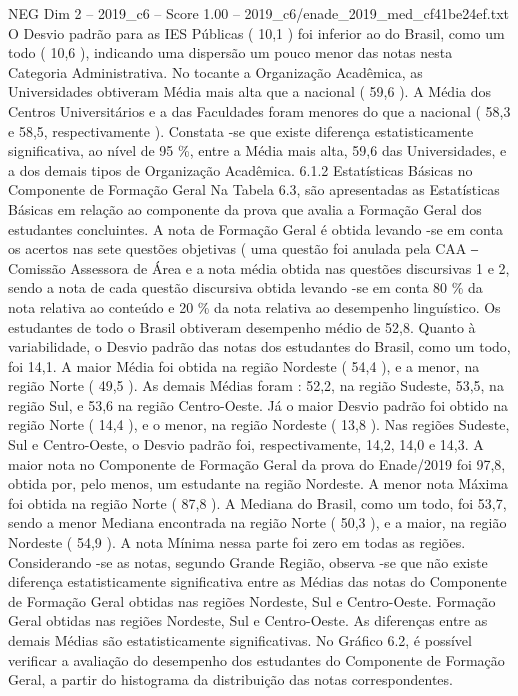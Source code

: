 \begin{textsample}{NEG Dim 2 – 2019\_c6 – Score 1.00 – 2019\_c6/enade\_2019\_med\_cf41be24ef.txt}
O Desvio padrão para as IES Públicas ( 10,1 ) foi inferior ao do Brasil, como um todo ( 10,6 ), indicando uma dispersão um pouco menor das notas nesta Categoria Administrativa.
No tocante a Organização Acadêmica, as Universidades obtiveram Média mais alta que a nacional ( 59,6 ).
A Média dos Centros Universitários e a das Faculdades foram menores do que a nacional ( 58,3 e 58,5, respectivamente ).
Constata -se que existe diferença estatisticamente significativa, ao nível de 95 \%, entre a Média mais alta, 59,6 das Universidades, e a dos demais tipos de Organização Acadêmica. 6.1.2 Estatísticas Básicas no Componente de Formação Geral Na Tabela 6.3, são apresentadas as Estatísticas Básicas em relação ao componente da prova que avalia a Formação Geral dos estudantes concluintes.
A nota de Formação Geral é obtida levando -se em conta os acertos nas sete questões objetivas ( uma questão foi anulada pela CAA ‒ Comissão Assessora de Área e a nota média obtida nas questões discursivas 1 e 2, sendo a nota de cada questão discursiva obtida levando -se em conta 80 \% da nota relativa ao conteúdo e 20 \% da nota relativa ao desempenho linguístico.
Os estudantes de todo o Brasil obtiveram desempenho médio de 52,8.
Quanto à variabilidade, o Desvio padrão das notas dos estudantes do Brasil, como um todo, foi 14,1.
A maior Média foi obtida na região Nordeste ( 54,4 ), e a menor, na região Norte ( 49,5 ).
As demais Médias foram : 52,2, na região Sudeste, 53,5, na região Sul, e 53,6 na região Centro-Oeste.
Já o maior Desvio padrão foi obtido na região Norte ( 14,4 ), e o menor, na região Nordeste ( 13,8 ).
Nas regiões Sudeste, Sul e Centro-Oeste, o Desvio padrão foi, respectivamente, 14,2, 14,0 e 14,3.
A maior nota no Componente de Formação Geral da prova do Enade/2019 foi 97,8, obtida por, pelo menos, um estudante na região Nordeste.
A menor nota Máxima foi obtida na região Norte ( 87,8 ).
A Mediana do Brasil, como um todo, foi 53,7, sendo a menor Mediana encontrada na região Norte ( 50,3 ), e a maior, na região Nordeste ( 54,9 ).
A nota Mínima nessa parte foi zero em todas as regiões.
Considerando -se as notas, segundo Grande Região, observa -se que não existe diferença estatisticamente significativa entre as Médias das notas do Componente de Formação Geral obtidas nas regiões Nordeste, Sul e Centro-Oeste.
Formação Geral obtidas nas regiões Nordeste, Sul e Centro-Oeste.
As diferenças entre as demais Médias são estatisticamente significativas.
No Gráfico 6.2, é possível verificar a avaliação do desempenho dos estudantes do Componente de Formação Geral, a partir do histograma da distribuição das notas correspondentes.

\end{textsample}
